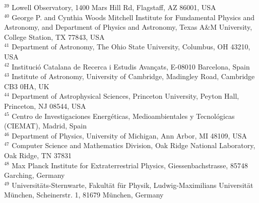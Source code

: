 {$^{39}$ Lowell Observatory, 1400 Mars Hill Rd, Flagstaff, AZ 86001, USA\\
$^{40}$ George P. and Cynthia Woods Mitchell Institute for Fundamental Physics and Astronomy, and Department of Physics and Astronomy, Texas A\&M University, College Station, TX 77843,  USA\\
$^{41}$ Department of Astronomy, The Ohio State University, Columbus, OH 43210, USA\\
$^{42}$ Instituci\'o Catalana de Recerca i Estudis Avan\c{c}ats, E-08010 Barcelona, Spain\\
$^{43}$ Institute of Astronomy, University of Cambridge, Madingley Road, Cambridge CB3 0HA, UK\\
$^{44}$ Department of Astrophysical Sciences, Princeton University, Peyton Hall, Princeton, NJ 08544, USA\\
$^{45}$ Centro de Investigaciones Energ\'eticas, Medioambientales y Tecnol\'ogicas (CIEMAT), Madrid, Spain\\
$^{46}$ Department of Physics, University of Michigan, Ann Arbor, MI 48109, USA\\
$^{47}$ Computer Science and Mathematics Division, Oak Ridge National Laboratory, Oak Ridge, TN 37831\\
$^{48}$ Max Planck Institute for Extraterrestrial Physics, Giessenbachstrasse, 85748 Garching, Germany\\
$^{49}$ Universit\"ats-Sternwarte, Fakult\"at f\"ur Physik, Ludwig-Maximilians Universit\"at M\"unchen, Scheinerstr. 1, 81679 M\"unchen, Germany\\
}
